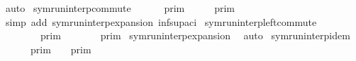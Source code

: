\begin{isabellebody}
%
\isadelimproof
%
\endisadelimproof
%
\isatagproof
{}\isamarkupfalse%
\ auto%
\endisatagproof
{\isafoldproof}%
%
\isadelimproof
\isanewline
%
\endisadelimproof
\isanewline
{}\isamarkupfalse%
\ symrun{\isacharunderscore}interp{\isacharunderscore}commute{\isacharcolon}\isanewline
\ \ {\isacartoucheopen}{\isasymlbrakk}{\isasymlbrakk}\ {\isasymGamma}\ {\isacharat}\ {\isasymGamma}\ {\isasymrbrakk}{\isasymrbrakk}\isactrlsub p\isactrlsub r\isactrlsub i\isactrlsub m\ {\isacharequal}\ {\isasymlbrakk}{\isasymlbrakk}\ {\isasymGamma}\ {\isacharat}\ {\isasymGamma}\ {\isasymrbrakk}{\isasymrbrakk}\isactrlsub p\isactrlsub r\isactrlsub i\isactrlsub m{\isacartoucheclose}\isanewline
%
\isadelimproof
%
\endisadelimproof
%
\isatagproof
{}\isamarkupfalse%
\ {\isacharparenleft}simp\ add{\isacharcolon}\ symrun{\isacharunderscore}interp{\isacharunderscore}expansion\ inf{\isacharunderscore}sup{\isacharunderscore}aci{\isacharparenleft}{}{\isacharparenright}{\isacharparenright}%
\endisatagproof
{\isafoldproof}%
%
\isadelimproof
\isanewline
%
\endisadelimproof
\isanewline
{}\isamarkupfalse%
\ symrun{\isacharunderscore}interp{\isacharunderscore}left{\isacharunderscore}commute{\isacharcolon}\isanewline
\ \ {\isacartoucheopen}{\isasymlbrakk}{\isasymlbrakk}\ {\isasymGamma}\ {\isacharat}\ {\isacharparenleft}{\isasymGamma}\ {\isacharat}\ {\isasymGamma}\ {\isasymrbrakk}{\isasymrbrakk}\isactrlsub p\isactrlsub r\isactrlsub i\isactrlsub m\ {\isacharequal}\ {\isasymlbrakk}{\isasymlbrakk}\ {\isasymGamma}\ {\isacharat}\ {\isacharparenleft}{\isasymGamma}\ {\isacharat}\ {\isasymGamma}\ {\isasymrbrakk}{\isasymrbrakk}\isactrlsub p\isactrlsub r\isactrlsub i\isactrlsub m{\isacartoucheclose}\isanewline
%
\isadelimproof
%
\endisadelimproof
%
\isatagproof
{}\isamarkupfalse%
\ symrun{\isacharunderscore}interp{\isacharunderscore}expansion\ \isamarkupfalse%
\ auto%
\endisatagproof
{\isafoldproof}%
%
\isadelimproof
\isanewline
%
\endisadelimproof
\isanewline
{}\isamarkupfalse%
\ symrun{\isacharunderscore}interp{\isacharunderscore}idem{\isacharcolon}\isanewline
\ \ {\isacartoucheopen}{\isasymlbrakk}{\isasymlbrakk}\ {\isasymGamma}\ {\isacharat}\ {\isasymGamma}\ {\isasymrbrakk}{\isasymrbrakk}\isactrlsub p\isactrlsub r\isactrlsub i\isactrlsub m\ {\isacharequal}\ {\isasymlbrakk}{\isasymlbrakk}\ {\isasymGamma}\ {\isasymrbrakk}{\isasymrbrakk}\isactrlsub p\isactrlsub r\isactrlsub i\isactrlsub m{\isacartoucheclose}\isanewline

\end{isabellebody}
